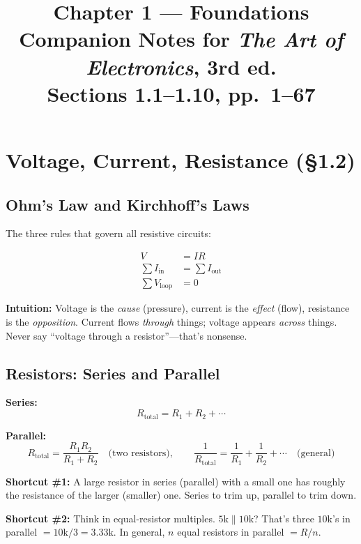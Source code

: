 \documentclass[11pt,a4paper]{article}
\title{\vspace{-2em}\textbf{Chapter 1 --- Foundations}\\[0.3em]
\large Companion Notes for \textit{The Art of Electronics}, 3rd ed.\\
Sections 1.1--1.10, pp.\ 1--67}
\author{}
\date{}
\newcommand{\intuition}[1]{\par\textcolor{intuition}{\textbf{Intuition:}} #1}
\begin{document}
\maketitle
\thispagestyle{fancy}

\section{Voltage, Current, Resistance (\S1.2)}

\subsection{Ohm's Law and Kirchhoff's Laws}

The three rules that govern all resistive circuits:

\begin{align}
V &= IR \tag{Ohm's law} \\
\sum I_{\text{in}} &= \sum I_{\text{out}} \tag{KCL} \\
\sum V_{\text{loop}} &= 0 \tag{KVL}
\end{align}

\intuition{Voltage is the \emph{cause} (pressure), current is the \emph{effect} (flow), resistance is the \emph{opposition}. Current flows \emph{through} things; voltage appears \emph{across} things. Never say ``voltage through a resistor''---that's nonsense.}

\subsection{Resistors: Series and Parallel}

\textbf{Series:}
\[R_{\text{total}} = R_1 + R_2 + \cdots\]

\textbf{Parallel:}
\[R_{\text{total}} = \frac{R_1 R_2}{R_1 + R_2} \quad\text{(two resistors)}, \qquad
\frac{1}{R_{\text{total}}} = \frac{1}{R_1} + \frac{1}{R_2} + \cdots \quad\text{(general)}\]

\textbf{Shortcut \#1:} A large resistor in series (parallel) with a small one has roughly the resistance of the larger (smaller) one. Series to trim up, parallel to trim down.

\textbf{Shortcut \#2:} Think in equal-resistor multiples. $5\text{k} \| 10\text{k}$? That's three $10\text{k}$'s in parallel $= 10\text{k}/3 = 3.33\text{k}$. In general, $n$ equal resistors in parallel $= R/n$.
\end{document}
